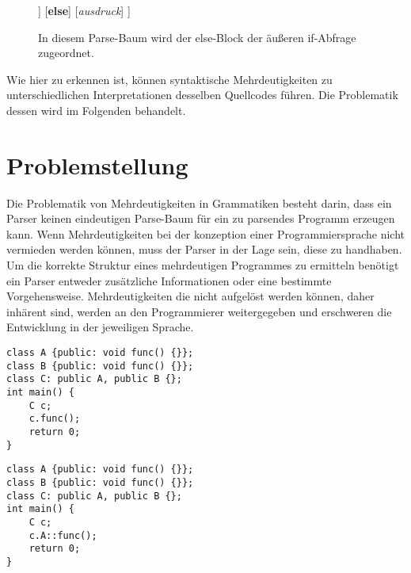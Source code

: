 \documentclass[runningheads]{llncs}
\begin{document}
	\begin{figure}
		\centering
		\begin{forest}
		[\textit{ausdruck}
		[\textbf{if}]
		[\textit{bedingung}]
		[\textbf{then}]
		[\textit{ausdruck}
		[\textbf{if}]
		[\textit{bedingung}]
		[\textbf{then}]
		[\textit{ausdruck}]
		]
		[\textbf{else}]
		[\textit{ausdruck}]
		]
		\end{forest}
		\caption{In diesem Parse-Baum wird der else-Block der äußeren if-Abfrage zugeordnet.}
		\label{fig:figure2}
	\end{figure}

	Wie hier zu erkennen ist,
	können syntaktische Mehrdeutigkeiten zu unterschiedlichen Interpretationen desselben Quellcodes führen.
	Die Problematik dessen wird im Folgenden behandelt.


	\section{Problemstellung}

	Die Problematik von Mehrdeutigkeiten in Grammatiken besteht darin,
	dass ein Parser keinen eindeutigen Parse-Baum für ein zu parsendes Programm erzeugen kann.
	Wenn Mehrdeutigkeiten bei der konzeption einer Programmiersprache nicht vermieden werden können,
	muss der Parser in der Lage sein, diese zu handhaben.
	Um die korrekte Struktur eines mehrdeutigen Programmes zu ermitteln benötigt ein Parser
	entweder zusätzliche Informationen oder eine bestimmte Vorgehensweise.
	Mehrdeutigkeiten die nicht aufgelöst werden können, daher inhärent sind,
	werden an den Programmierer weitergegeben und erschweren die Entwicklung in der jeweiligen Sprache.


	\begin{flushleft}
		\begin{minipage}{0.48\textwidth}
			\begin{lstlisting}[style=cppStyle,label={lst:lstlisting1}]
class A {public: void func() {}};
class B {public: void func() {}};
class C: public A, public B {};
int main() {
	C c;
	c.func();
	return 0;
}
			\end{lstlisting}
		\end{minipage}
		\hfill
		\begin{minipage}{0.48\textwidth}
			\begin{lstlisting}[style=cppStyle,label={lst:lstlisting2}]
class A {public: void func() {}};
class B {public: void func() {}};
class C: public A, public B {};
int main() {
	C c;
	c.A::func();
	return 0;
}
			\end{lstlisting}
		\end{minipage}
	\end{flushleft}
\end{document}
